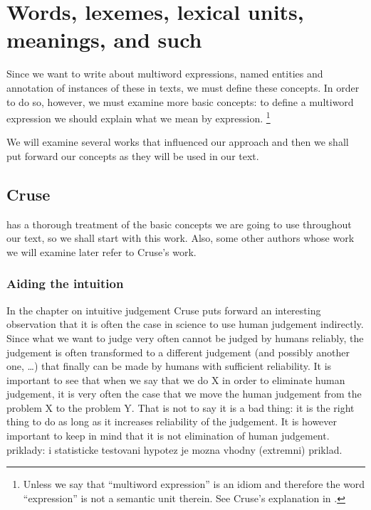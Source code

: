 
\chapter{Words, lexemes, lexical units, meanings, and such}
Since we want to write about multiword expressions, named entities and annotation of instances of these in texts, we must define these concepts. In order to do so, however, we must examine more basic concepts: to define a multiword expression we should explain what we mean by expression. %
\footnote{Unless we say that ``multiword expression'' is an idiom and therefore the word ``expression'' is not a semantic unit therein. See Cruse's explanation in .
} %

We will examine several works that influenced our approach and then we shall put forward our concepts as they will be used in our text.

\section{Cruse}
\label{rel:cruse}
\citetext{D. A. Cruse in his book \emph{Lexical Semantics}, \citeyear{cruse:1986}} has a thorough treatment of the basic concepts we are going to use throughout our text, so we shall start with this work. Also, some other authors whose work we will examine later refer to Cruse's work. 

\subsection{Aiding the intuition}
In the chapter on intuitive judgement Cruse puts forward an interesting observation that it is often the case in science to use human judgement indirectly. Since what we want to judge very often cannot be judged by humans reliably, the judgement is often transformed to a different judgement (and possibly another one, \ldots) that finally can be made by humans with sufficient reliability. It is important to see that when we say that we do X in order to eliminate human judgement, it is very often the case that we move the human judgement from the problem X to the problem Y. That is not to say it is a bad thing: it is the right thing to do as long as it increases reliability of the judgement. It is however important to keep in mind that it is not elimination of human judgement. {\xxx priklady: i statisticke testovani hypotez je mozna vhodny (extremni) priklad.}

